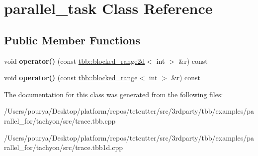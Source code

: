 \hypertarget{classparallel__task}{}\section{parallel\+\_\+task Class Reference}
\label{classparallel__task}
\subsection*{Public Member Functions}
\begin{DoxyCompactItemize}
\item 
\hypertarget{classparallel__task_ad0914aeac9894fe72d7ce6f27d7cad2b}{}void {\bfseries operator()} (const \hyperlink{classtbb_1_1blocked__range2d}{tbb\+::blocked\+\_\+range2d}$<$ int $>$ \&r) const \label{classparallel__task_ad0914aeac9894fe72d7ce6f27d7cad2b}

\item 
\hypertarget{classparallel__task_ac639ea7666fb5cfb377a7c1d21627834}{}void {\bfseries operator()} (const \hyperlink{classtbb_1_1blocked__range}{tbb\+::blocked\+\_\+range}$<$ int $>$ \&r) const \label{classparallel__task_ac639ea7666fb5cfb377a7c1d21627834}

\end{DoxyCompactItemize}


The documentation for this class was generated from the following files\+:\begin{DoxyCompactItemize}
\item 
/\+Users/pourya/\+Desktop/platform/repos/tetcutter/src/3rdparty/tbb/examples/parallel\+\_\+for/tachyon/src/trace.\+tbb.\+cpp\item 
/\+Users/pourya/\+Desktop/platform/repos/tetcutter/src/3rdparty/tbb/examples/parallel\+\_\+for/tachyon/src/trace.\+tbb1d.\+cpp\end{DoxyCompactItemize}
